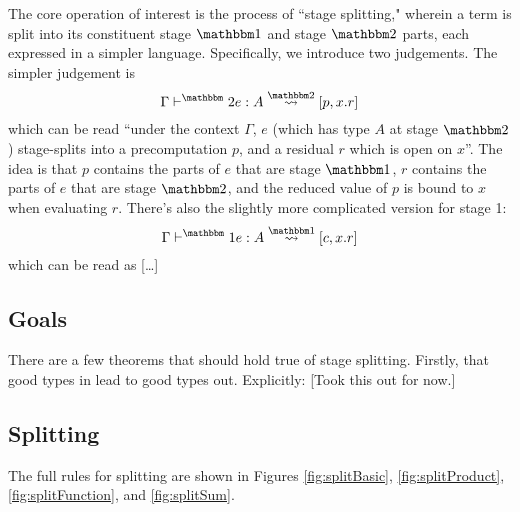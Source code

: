 \documentclass[11pt]{article}
\newcommand {\bbone} {\mathbbm 1}
\newcommand {\bbtwo} {\mathbbm 2}
\newcommand {\gdo} {{\Gamma \vdash^\bbone}}
\newcommand {\gdt} {{\Gamma \vdash^\bbtwo}}
\newcommand {\splito} {\overset{\bbone}\rightsquigarrow}
\newcommand {\splits} {\overset{\bbtwo}\rightsquigarrow}
\newcommand {\wstage} {\textsc{Stag}}
\newcommand {\wostage} {\textsc{Doe}}
\begin{document}
The core operation of interest is the process of ``stage splitting," wherein a term is split into its constituent stage $\bbone$ and stage $\bbtwo$ parts, each expressed in a simpler language.  Specifically, we introduce two judgements.  The simpler judgement is 
\[\gdt e : A \splits [p,x.r]\] 
which can be read ``under the context $\Gamma$, $e$ (which has type $A$ at stage $\bbtwo$) stage-splits into a precomputation $p$, and a residual $r$ which is open on $x$''.  The idea is that $p$ contains the parts of $e$ that are stage $\bbone$, $r$ contains the parts of $e$ that are stage $\bbtwo$, and the reduced value of $p$ is bound to $x$ when evaluating $r$.  There's also the slightly more complicated version for stage 1:
\[\gdo e : A \splito [c,x.r]\]
which can be read as [\ldots]

\subsection {Goals}

There are a few theorems that should hold true of stage splitting.  Firstly, that good types in lead to good types out.  Explicitly:
[Took this out for now.]
%

\subsection {Splitting}
The full rules for splitting are shown in Figures \ref{fig:splitBasic}, \ref{fig:splitProduct}, \ref{fig:splitFunction}, and \ref{fig:splitSum}.
\end{document}
